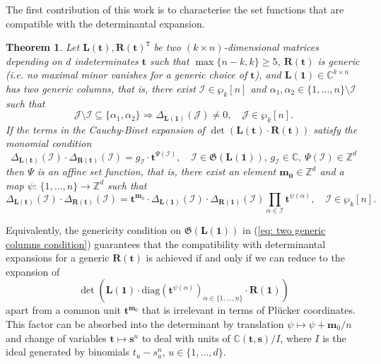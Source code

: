 \documentclass[10pt]{article}
\newtheorem{thm}{Theorem}
\theoremstyle{remark}%
\theoremstyle{definition}%
\begin{document}
The first contribution of this work is to characterise the set functions that are compatible with the determinantal expansion.  
\begin{thm}
\label{thm: rigidity theorem monomial}
Let $\mathbf{L}(\mathbf{t}),\mathbf{R}(\mathbf{t})^{\mathtt{T}}$ be two $(k\times n)$-dimensional matrices depending on $d$ indeterminates $\mathbf{t}$ such that $\max\{n-k,k\}\geq 5$, $\mathbf{R}(\mathbf{t})$ is generic (i.e. no maximal minor vanishes for a generic choice of $\mathbf{t}$), and $\mathbf{L}(\mathbf{1})\in\mathbb{C}^{k\times n}$ has two generic columns, that is, there exist $\mathcal{I}\in\wp_{k}[n]$ and $\alpha_{1},\alpha_{2}\in\{1,\dots,n\}\setminus\mathcal{I}$ such that
\begin{equation}
    \mathcal{J}\setminus\mathcal{I}\subseteq \{\alpha_{1},\alpha_{2}\} \Rightarrow \Delta_{\mathbf{L}(\mathbf{1})}(\mathcal{J})\neq0,\quad \mathcal{J}\in\wp_{k}[n].
\label{eq: two generic columns condition}
\end{equation}
If the terms in the Cauchy-Binet expansion of $\det(\mathbf{L}(\mathbf{t})\cdot\mathbf{R}(\mathbf{t}))$ satisfy the monomial condition 
 \begin{equation}
\Delta_{\mathbf{L}(\mathbf{t})}(\mathcal{I})\cdot\Delta_{\mathbf{R}(\mathbf{t})}(\mathcal{I})=g_{\mathcal{I}}\cdot \mathbf{t}^{\Psi(\mathcal{I})},\quad\mathcal{I}\in\mathfrak{G}(\mathbf{L}(\mathbf{1})),\,g_{\mathcal{I}}\in\mathbb{C},\,\Psi(\mathcal{I})\in\mathbb{Z}^{d}
\label{eq: monomial terms of Cauchy-Binet expansion}
 \end{equation}
then $\Psi$ is an affine set function, that is, there exist an element $\mathbf{m_{0}}\in\mathbb{Z}^{d}$ and a map $\psi:\,\{1,\dots,n\}\longrightarrow\mathbb{Z}^{d}$ such that
 \begin{equation}
\Delta_{\mathbf{L}(\mathbf{t})}(\mathcal{I})\cdot\Delta_{\mathbf{R}(\mathbf{t})}(\mathcal{I})=\mathbf{t}^{\mathbf{m}_{0}}\cdot\Delta_{\mathbf{L}(\mathbf{1})}(\mathcal{I})\cdot\Delta_{\mathbf{R}(\mathbf{1})}(\mathcal{I})\prod_{\alpha\in\mathcal{I}}\mathbf{t}^{\psi(\alpha)},\quad\mathcal{I}\in\wp_{k}[n].
\label{eq: set-to-element integrability}
 \end{equation} 
\end{thm}
Equivalently, the genericity condition on $\mathfrak{G}(\mathbf{L}(\mathbf{1}))$ in (\ref{eq: two generic columns condition}) guarantees that the compatibility with determinantal expansions for a generic $\mathbf{R}(\mathbf{t})$ is achieved if and only if we can reduce to the expansion of  
\begin{equation} 
\det\left(\mathbf{L}(\mathbf{1})\cdot \mathrm{diag}(\mathbf{t}^{\psi(\alpha)})_{\alpha\in\{1,\dots,n\}} \cdot \mathbf{R}(\mathbf{1})\right) 
\end{equation} 
apart from a common unit $\mathbf{t}^{\mathbf{m}_{0}}$ that is irrelevant in terms of Pl\"{u}cker coordinates. This factor can be absorbed into the determinant by translation $\psi\mapsto \psi +\mathbf{m}_{0}/n$ and change of variables $\mathbf{t}\mapsto \mathbf{s}^{n}$ to deal with units of $\mathbb{C}(\mathbf{t},\mathbf{s})/I$, where $I$ is the ideal generated by binomials $t_{u}-s_{u}^{n}$, $u\in\{1,\dots,d\}$. 
\end{document}

